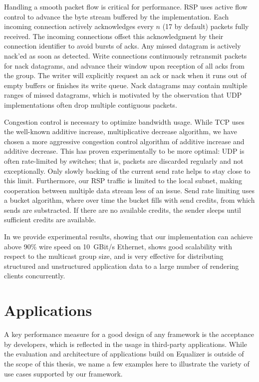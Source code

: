 Handling a smooth packet flow is critical for performance. RSP uses active flow
control to advance the byte stream buffered by the implementation. Each incoming
connection actively acknowledges every $n$ (17 by default) packets fully
received. The incoming connections offset this acknowledgment by their
connection identifier to avoid bursts of acks. Any missed datagram is actively
nack'ed as soon as detected. Write connections continuously retransmit packets
for nack datagrams, and advance their window upon reception of all acks from the
group. The writer will explicitly request an ack or nack when it runs out of
empty buffers or finishes its write queue. Nack datagrams may contain multiple
ranges of missed datagrams, which is motivated by the observation that UDP
implementations often drop multiple contiguous packets.

Congestion control is necessary to optimize bandwidth usage. While TCP uses the
well-known additive increase, multiplicative decrease algorithm, we have chosen
a more aggressive congestion control algorithm of additive increase and additive
decrease. This has proven experimentally to be more optimal: UDP is often
rate-limited by switches; that is, packets are discarded regularly and not
exceptionally. Only slowly backing of the current send rate helps to stay close
to this limit. Furthermore, our RSP traffic is limited to the local subnet,
making cooperation between multiple data stream less of an issue. Send rate
limiting uses a bucket algorithm, where over time the bucket fills with send
credits, from which sends are substracted. If there are no available credits,
the sender sleeps until sufficient credits are available.

In \cite{ESP:18} we provide experimental results, showing that our
implementation can achieve above 90\% wire speed on 10~GBit/s Ethernet, shows
good scalability with respect to the multicast group size, and is very effective
for distributing structured and unstructured application data to a large number
of rendering clients concurrently.

\chapter{Applications}\label{sApplications}

A key performance measure for a good design of any framework is the acceptance
by developers, which is reflected in the usage in third-party applications.
While the evaluation and architecture of applications build on Equalizer is
outside of the scope of this thesis, we name a few examples here to illustrate
the variety of use cases supported by our framework.

